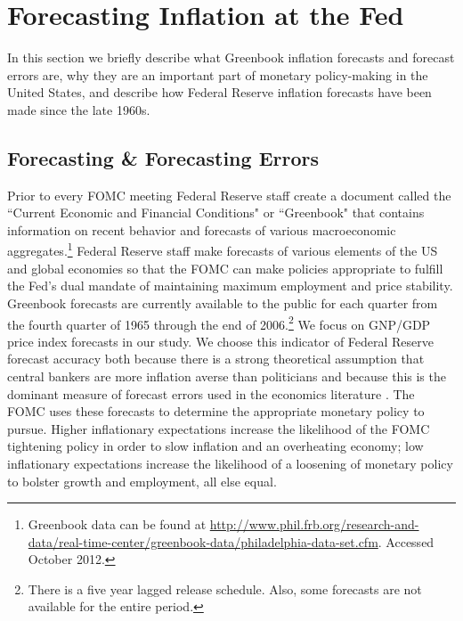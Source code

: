 \documentclass[a4paper]{article}\usepackage{graphicx, color}
\begin{document}

\section{Forecasting Inflation at the Fed}

In this section we briefly describe what Greenbook inflation forecasts and forecast errors are, why they are an important part of monetary policy-making in the United States, and describe how Federal Reserve inflation forecasts have been made since the late 1960s.

\subsection{Forecasting \& Forecasting Errors}

Prior to every FOMC meeting Federal Reserve staff create a document called the ``Current Economic and Financial Conditions" or ``Greenbook" that contains information on recent behavior and forecasts of various macroeconomic aggregates.\footnote{Greenbook data can be found at {\url{http://www.phil.frb.org/research-and-data/real-time-center/greenbook-data/philadelphia-data-set.cfm}}. Accessed October 2012.} Federal Reserve staff make forecasts of various elements of the US and global economies so that the FOMC can make policies appropriate to fulfill the Fed's dual mandate of maintaining maximum employment and price stability. Greenbook forecasts are currently available to the public for each quarter from the fourth quarter of 1965 through the end of 2006.\footnote{There is a five year lagged release schedule. Also, some forecasts are not available for the entire period.}  We focus on GNP/GDP price index forecasts in our study. We choose this indicator of Federal Reserve forecast accuracy both because there is a strong theoretical assumption that central bankers are more inflation averse than politicians \citep{Cukierman1992,Mukherjee2008,Tillmann2008} and because this is the dominant measure of forecast errors used in the economics literature \citep[c.f.][]{Romer2000}. The FOMC uses these forecasts to determine the appropriate monetary policy to pursue. Higher inflationary expectations increase the likelihood of the FOMC tightening policy in order to slow inflation and an overheating economy; low inflationary expectations increase the likelihood of a loosening of monetary policy to bolster growth and employment, all else equal.
\end{document}
